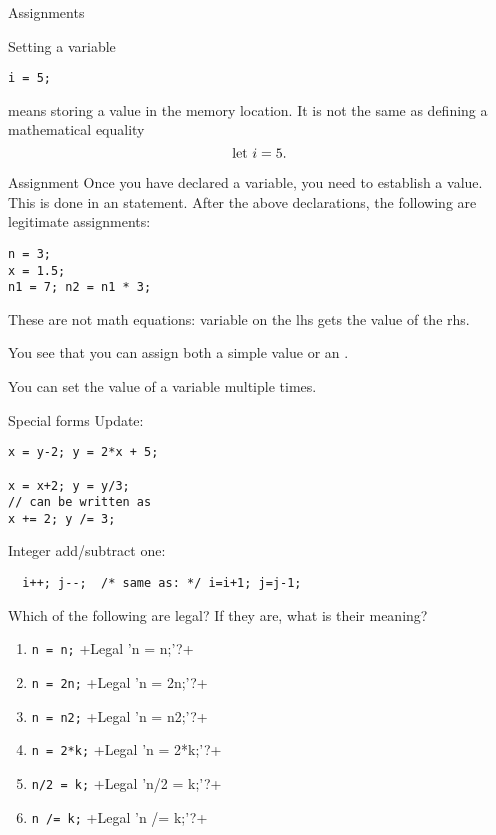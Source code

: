  {Assignments}
\label{c:assign}

Setting a variable
\begin{lstlisting}
i = 5;
\end{lstlisting}
means storing a value in the memory location. It is
not the same as defining a mathematical equality
\[ \hbox{let $i=5$}. \]

\begin{block}{Assignment}
  \label{sl:assign1}
  Once you have declared a variable, you need to establish a value. This is done in an
   statement. After the above declarations, the
  following are legitimate assignments:
\begin{lstlisting}
n = 3;
x = 1.5;
n1 = 7; n2 = n1 * 3;
\end{lstlisting}
These are not math equations: variable on the lhs gets the value of
the rhs.

You see that you can assign both a simple value or an
.
\end{block}

You can set the value of a variable multiple times.

\begin{block}{Special forms}
  \label{sl:special-assign}
  Update:
\begin{lstlisting}
x = y-2; y = 2*x + 5;
    
x = x+2; y = y/3;
// can be written as
x += 2; y /= 3;
\end{lstlisting}
Integer add/subtract one:
\begin{lstlisting}
  i++; j--;  /* same as: */ i=i+1; j=j-1;
\end{lstlisting}
\end{block}

\begin{exercise}
  \label{q:assign}
  Which of the following are legal? If they are, what is their meaning?
  \begin{enumerate}
  \item \lstinline{n = n;}
    \slackpollTF+Legal 'n = n;'?+
  \item \lstinline{n = 2n;}
    \slackpollTF+Legal 'n = 2n;'?+
  \item \lstinline{n = n2;}
    \slackpollTF+Legal 'n = n2;'?+
  \item \lstinline{n = 2*k;}
    \slackpollTF+Legal 'n = 2*k;'?+
  \item \lstinline{n/2 = k;}
    \slackpollTF+Legal 'n/2 = k;'?+
  \item \lstinline{n /= k;}
    \slackpollTF+Legal 'n /= k;'?+
  \end{enumerate}
\end{exercise}

